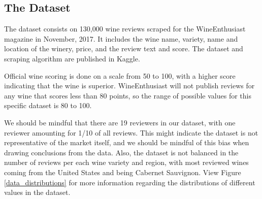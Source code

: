 \documentclass[11pt]{article}
\begin{document}
\subsection{The Dataset}
    The dataset consists on 130,000 wine reviews scraped for the WineEnthusiast magazine in November, 2017\cite{data}. It includes the wine name, variety, name and location of the winery, price, and the review text and score. The dataset and scraping algorithm are published in Kaggle. \par
    Official wine scoring is done on a scale from 50 to 100, with a higher score indicating that the wine is superior. WineEnthusiast will not publish reviews for any wine that scores less than 80 points, so the range of possible values for this specific dataset is 80 to 100. \par
    We should be mindful that there are 19 reviewers in our dataset, with one reviewer amounting for 1/10 of all reviews. This might indicate the dataset is not representative of the market itself, and we should be mindful of this bias when drawing conclusions from the data. 
    Also, the dataset is not balanced in the number of reviews per each wine variety and region, with most reviewed wines coming from the United States and being Cabernet Sauvignon. View Figure \ref{data_distributions} for more information regarding the distributions of different values in the dataset. \par
\end{document}
